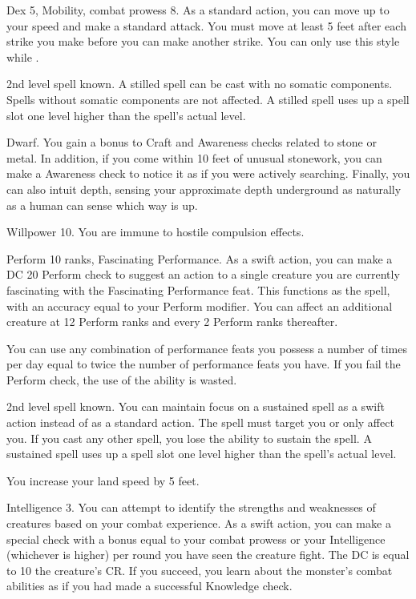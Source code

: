 \featpres Dex 5, Mobility, combat prowess 8.
\featben As a standard action, you can move up to your speed and make a standard attack.
You must move at least 5 feet after each strike you make before you can make another strike.
You can only use this style while \unencumbered.

\featpre 2nd level spell known.
\featben A stilled spell can be cast with no somatic components.
Spells without somatic components are not affected.
A stilled spell uses up a spell slot one level higher than the spell's actual level.

\featpre Dwarf.
\featben You gain a  bonus to Craft and Awareness checks related to stone or metal.
In addition, if you come within 10 feet of unusual stonework, you can make a Awareness check to notice it as if you were actively searching.
Finally, you can also intuit depth, sensing your approximate depth underground as naturally as a human can sense which way is up.

\featpre Willpower 10.
\featben You are immune to hostile compulsion effects.

\featpres Perform 10 ranks, Fascinating Performance.
\featben As a swift action, you can make a DC 20 Perform check to suggest an action to a single creature you are currently fascinating with the Fascinating Performance feat.
This functions as the  spell, with an accuracy equal to your Perform modifier.
You can affect an additional creature at 12 Perform ranks and every 2 Perform ranks thereafter.

You can use any combination of performance feats you possess a number of times per day equal to twice the number of performance feats you have.
If you fail the Perform check, the use of the ability is wasted.

\featpre 2nd level spell known.
\featben You can maintain focus on a sustained spell as a swift action instead of as a standard action.
The spell must target you or only affect you.
If you cast any other spell, you lose the ability to sustain the spell.
A sustained spell uses up a spell slot one level higher than the spell's actual level.

\featben You increase your land speed by 5 feet.

\featpre Intelligence 3.
\featben You can attempt to identify the strengths and weaknesses of creatures based on your combat experience.
As a swift action, you can make a special check with a bonus equal to your combat prowess or your Intelligence (whichever is higher)  per round you have seen the creature fight.
The DC is equal to 10 \add the creature's CR.
If you succeed, you learn about the monster's combat abilities as if you had made a successful Knowledge check.

